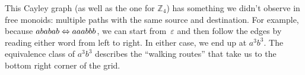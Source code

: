 \documentclass[../generics]{subfiles}
\begin{document}
\begin{example}
\begin{center}
\end{center}

This Cayley graph (as well as the one for $\mathbb{Z}_4$) has something we didn't observe in free monoids: multiple paths with the same source and destination. For example, because $ababab\Leftrightarrow aaabbb$, we can start from~$\varepsilon$ and then follow the edges by reading either word from left to right. In either case, we end up at $a^3b^3$. The equivalence class of $a^3b^3$ describes the ``walking routes'' that take us to the bottom right corner of the grid.
\end{example}

\newcommand{\Bicyclic}{\Pres{a, b}{ab\Eq\varepsilon}}
\end{document}
